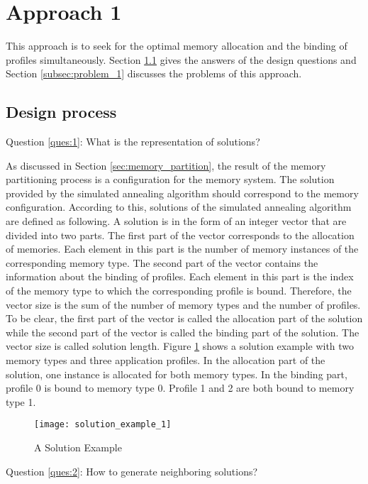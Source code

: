 	\section{Approach 1}
	\label{sec:stage_1}
	This approach is to seek for the optimal memory allocation and the binding of profiles
	simultaneously. Section \ref{subsec:design_1} gives the answers of the design
	questions and Section \ref{subsec:problem_1} discusses the problems of this approach.
		\subsection{Design process}
		\label{subsec:design_1}
		Question \ref{ques:1}: What is the representation of solutions?
		
		As discussed in Section \ref{sec:memory_partition}, the result of the memory
		partitioning process is a configuration for the memory system.
		The solution provided by the simulated annealing algorithm should correspond to the memory configuration.
		According to this, solutions of the simulated annealing algorithm are defined as following. A solution is in the form of an integer vector that are divided into two parts. The first part of the vector corresponds to the allocation of memories.
		Each element in this part is the number of memory instances of the corresponding
		memory type.
		The second part of the vector contains the information about the binding of profiles. Each element in this part is the index of the memory type to which the corresponding
		profile is bound.
		Therefore, the vector size is the sum of the number of memory types and the number of profiles.
		To be clear, the first part of the vector is called the allocation part of
		the solution while the second part of the vector is called the binding part
		of the solution. The vector size is called solution length.
		Figure \ref{fig:solu_exam_1} shows a solution example with two memory types and three application profiles.
		In the allocation part of the solution, one instance is allocated for both memory types.
		In the binding part, profile 0 is bound to memory type 0.
		Profile 1 and 2 are both bound to memory type 1.
		\begin{figure}[h]
			\begin{center}
				\texttt{[image: solution\_example\_1]}
				\caption{A Solution Example}
				\label{fig:solu_exam_1}
			\end{center}
		\end{figure}

		Question \ref{ques:2}: How to generate neighboring solutions?
		
